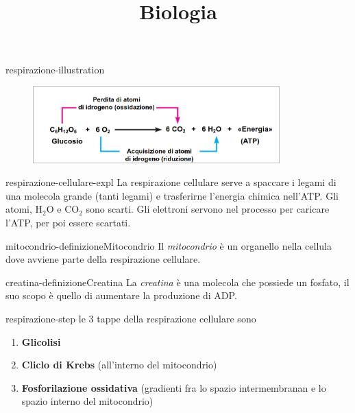 \documentclass[preview]{standalone}
\begin{document}
\title{Biologia}
\genpage

\begin{snippet}{respirazione-illustration}
    \begin{center}
    \begin{figure}[h]
        \centering
        \includegraphics[width=0.85\textwidth]{./resources/resp.png}
    \end{figure}
    \end{center}
\end{snippet}

\begin{snippet}{respirazione-cellulare-expl}
    La respirazione cellulare serve a spaccare i legami di una molecola grande
    (tanti legami) e trasferirne l'energia chimica nell'ATP.
    Gli atomi, H\({}_2\)O e CO\({}_2\) sono scarti. Gli elettroni servono nel processo per caricare l'ATP, per poi
    essere scartati.
\end{snippet}

\begin{snippetdefinition}{mitocondrio-definizione}{Mitocondrio}
    Il \textit{mitocondrio} è un organello nella cellula dove avviene parte della respirazione cellulare.
\end{snippetdefinition}


\begin{snippetdefinition}{creatina-definizione}{Creatina}
    La \textit{creatina} è una molecola che possiede un fosfato, il suo scopo è quello di aumentare la produzione di ADP.
\end{snippetdefinition}

\begin{snippet}{respirazione-step}
    le 3 tappe della respirazione cellulare sono
    \begin{enumerate}
        \item \textbf{Glicolisi}
        \item \textbf{Cliclo di Krebs} (all'interno del mitocondrio)
        \item \textbf{Fosforilazione ossidativa} (gradienti fra lo spazio intermembranan e lo spazio interno del mitocondrio)
    \end{enumerate}
\end{snippet}
\end{document}
